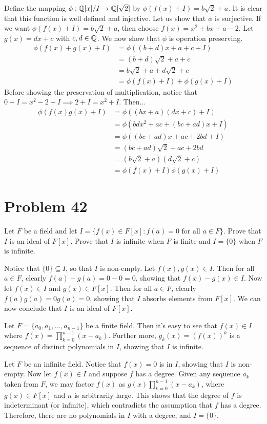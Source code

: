 \documentclass{article}
\begin{document}
Define the mapping
$\phi:\mathbb{Q}[x]/I\to\mathbb{Q}[\sqrt{2}]$ by
$\phi(f(x)+I)=b\sqrt{2}+a$.  It is clear that this function
is well defined and injective.
Let us show that $\phi$ is surjective.
If we want $\phi(f(x)+I)=b\sqrt{2}+a$, then choose
$f(x)=x^2+bx+a-2$.
Let $g(x)=dx+c$ with $c,d\in\mathbb{Q}$.
We now show that $\phi$ is operation preserving.
\begin{align*}
\phi(f(x)+g(x)+I)
&=\phi((b+d)x+a+c+I)\\
&=(b+d)\sqrt{2}+a+c \\
&=b\sqrt{2}+a+d\sqrt{2}+c \\
&=\phi(f(x)+I)+\phi(g(x)+I)
\end{align*}
Before showing the preservation of multiplication, notice that
$0+I=x^2-2+I\implies
2+I=x^2+I$.  Then...
\begin{align*}
\phi(f(x)g(x)+I) &= \phi((bx+a)(dx+c)+I) \\
 &= \phi(bdx^2+ac+(bc+ad)x+I) \\
 &= \phi((bc+ad)x+ac+2bd+I) \\
 &= (bc+ad)\sqrt{2}+ac+2bd \\
 &= (b\sqrt{2}+a)(d\sqrt{2}+c) \\
 &= \phi(f(x)+I)\phi(g(x)+I)
\end{align*}

\pagebreak
\section*{Problem 42}

Let $F$ be a field and let $I=\{f(x)\in F[x]:\mbox{$f(a)=0$ for all $a\in F$}\}$.
Prove that $I$ is an ideal of $F[x]$.  Prove that $I$ is infinite when $F$ is finite
and $I=\{0\}$ when $F$ is infinite.

Notice that $\{0\}\subseteq I$, so that $I$ is non-empty.
Let $f(x),g(x)\in I$.  Then for all $a\in F$, clearly $f(a)-g(a)=0-0=0$, showing
that $f(x)-g(x)\in I$.  Now let $f(x)\in I$ and $g(x)\in F[x]$.
Then for all $a\in F$, clearly $f(a)g(a)=0g(a)=0$, showing that $I$ absorbs
elements from $F[x]$.  We can now conclude that $I$ is an ideal of $F[x]$.

Let $F=\{a_0,a_1,\dots,a_{n-1}\}$ be a finite field.  Then it's
easy to see that $f(x)\in I$ where
$f(x)=\prod_{k=0}^{n-1}(x-a_k)$.  Further more, $g_k(x)=(f(x))^k$ is a sequence
of distinct polynomials in $I$, showing that $I$ is infinite.

Let $F$ be an infinite field.  Notice that $f(x)=0$ is in $I$, showing that
$I$ is non-empty.  Now let $f(x)\in I$ and suppose $f$ has a degree.
Given any sequence $a_k$
taken from $F$, we may factor $f(x)$ as $g(x)\prod_{k=0}^{n-1}(x-a_k)$, where
$g(x)\in F[x]$ and $n$ is arbitrarily large.
This shows that the degree of $f$ is indeterminant (or infinite), which
contradicts the assumption that $f$ has a degree.  Therefore, there are
no polynomials in $I$ with a degree, and $I=\{0\}$.
\end{document}
